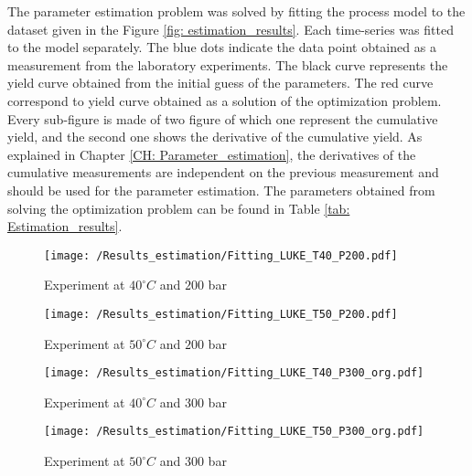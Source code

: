 \documentclass[../Article_Model_Parameters.tex]{subfiles}
\begin{document}
	
	\label{CH: Results}

    The parameter estimation problem was solved by fitting the process model to the dataset given in the Figure \ref{fig: estimation_results}. Each time-series was fitted to the model separately. The blue dots indicate the data point obtained as a measurement from the laboratory experiments. The black curve represents the yield curve obtained from the initial guess of the parameters. The red curve correspond to yield curve obtained as a solution of the optimization problem. Every sub-figure is made of two figure of which one represent the cumulative yield, and the second one shows the derivative of the cumulative yield. As explained in Chapter \ref{CH: Parameter_estimation}, the derivatives of the cumulative measurements are independent on the previous measurement and should be used for the parameter estimation.
    The parameters obtained from solving the optimization problem can be found in Table \ref{tab: Estimation_results}.
    
    \begin{figure*}[!h]
    	\centering
    	\begin{subfigure}[b]{\columnwidth}
    		\centering
    		\texttt{[image: /Results\_estimation/Fitting\_LUKE\_T40\_P200.pdf]}
    		\caption{Experiment at $40^\circ C$ and $200$ bar}
    	\end{subfigure}
    	\begin{subfigure}[b]{\columnwidth}
    		\centering
    		\texttt{[image: /Results\_estimation/Fitting\_LUKE\_T50\_P200.pdf]}
    		\caption{Experiment at $50^\circ C$ and $200$ bar}
    	\end{subfigure}
    	\hfill
    	\begin{subfigure}[b]{\columnwidth}
    		\centering
    		\texttt{[image: /Results\_estimation/Fitting\_LUKE\_T40\_P300\_org.pdf]}
    		\caption{Experiment at $40^\circ C$ and $300$ bar}
    	\end{subfigure}
    	\begin{subfigure}[b]{\columnwidth}
    		\centering
    		\texttt{[image: /Results\_estimation/Fitting\_LUKE\_T50\_P300\_org.pdf]}
    		\caption{Experiment at $50^\circ C$ and $300$ bar}
    	\end{subfigure}
    	\caption{Results of parameter estimation}
    	\label{fig: estimation_results}
    \end{figure*}
\end{document}
